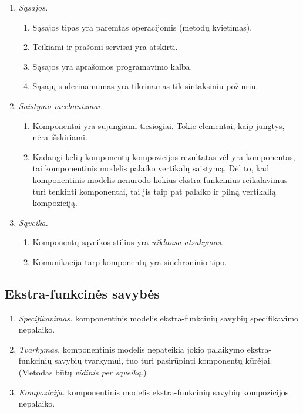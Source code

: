 \begin{enumerate}
  \item \emph{Sąsajos.}
    \begin{enumerate}
      \item Sąsajos tipas yra paremtas operacijomis (metodų kvietimas).
      \item Teikiami ir prašomi servisai yra atskirti.
      \item Sąsajos yra aprašomos  programavimo
        kalba.
      \item Sąsajų suderinamumas yra tikrinamas tik sintaksiniu
        požiūriu.
    \end{enumerate}
  \item \emph{Saistymo mechanizmai.}
    \begin{enumerate}
      \item Komponentai yra sujungiami tiesiogiai. Tokie elementai,
        kaip jungtys, nėra išskiriami.
      \item Kadangi kelių komponentų kompozicijos rezultatas vėl yra
        komponentas, tai  komponentinis modelis
        palaiko vertikalų saistymą. Dėl to, kad 
        komponentinis modelis nenurodo kokius ekstra-funkcinius
        reikalavimus turi tenkinti komponentai, tai jis taip pat
        palaiko ir pilną vertikalią kompoziciją.
    \end{enumerate}
  \item \emph{Sąveika.}
    \begin{enumerate}
      \item Komponentų sąveikos stilius yra \emph{užklausa-atsakymas}.
      \item Komunikacija tarp komponentų yra sinchroninio tipo.
    \end{enumerate}
\end{enumerate}

\subsection{Ekstra-funkcinės savybės}

\begin{enumerate}
  \item \emph{Specifikavimas.}
     komponentinis modelis ekstra-funkcinių savybių
    specifikavimo nepalaiko.
  \item \emph{Tvarkymas.}
     komponentinis modelis nepateikia jokio
    palaikymo ekstra-funkcinių savybių tvarkymui, tuo turi
    pasirūpinti komponentų kūrėjai. (Metodas būtų \emph{vidinis
    per sąveiką}.)
  \item \emph{Kompozicija.}
     komponentinis modelis ekstra-funkcinių savybių
    kompozicijos nepalaiko.
\end{enumerate}

